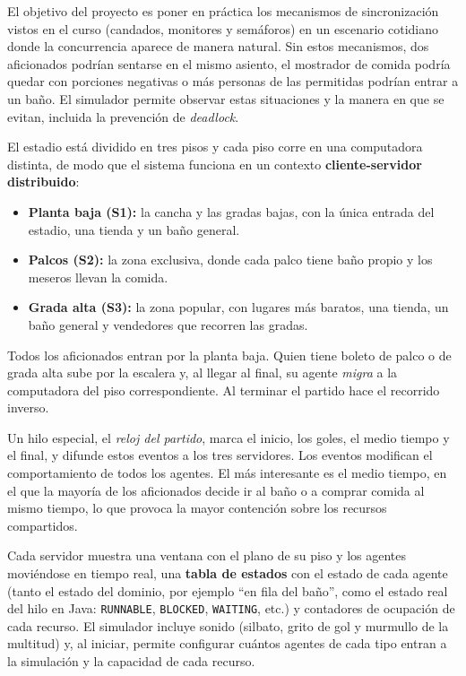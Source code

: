 \documentclass[11pt,letterpaper]{article}
\newcommand{\code}[1]{\texttt{#1}}
\begin{document}
El objetivo del proyecto es poner en práctica los mecanismos de sincronización vistos en el curso (candados, monitores y semáforos) en un escenario cotidiano donde la concurrencia aparece de manera natural. Sin estos mecanismos, dos aficionados podrían sentarse en el mismo asiento, el mostrador de comida podría quedar con porciones negativas o más personas de las permitidas podrían entrar a un baño. El simulador permite observar estas situaciones y la manera en que se evitan, incluida la prevención de \emph{deadlock}.

El estadio está dividido en tres pisos y cada piso corre en una computadora distinta, de modo que el sistema funciona en un contexto \textbf{cliente-servidor distribuido}:
\begin{itemize}
  \item \textbf{Planta baja (S1):} la cancha y las gradas bajas, con la única entrada del estadio, una tienda y un baño general.
  \item \textbf{Palcos (S2):} la zona exclusiva, donde cada palco tiene baño propio y los meseros llevan la comida.
  \item \textbf{Grada alta (S3):} la zona popular, con lugares más baratos, una tienda, un baño general y vendedores que recorren las gradas.
\end{itemize}
Todos los aficionados entran por la planta baja. Quien tiene boleto de palco o de grada alta sube por la escalera y, al llegar al final, su agente \emph{migra} a la computadora del piso correspondiente. Al terminar el partido hace el recorrido inverso.

Un hilo especial, el \emph{reloj del partido}, marca el inicio, los goles, el medio tiempo y el final, y difunde estos eventos a los tres servidores. Los eventos modifican el comportamiento de todos los agentes. El más interesante es el medio tiempo, en el que la mayoría de los aficionados decide ir al baño o a comprar comida al mismo tiempo, lo que provoca la mayor contención sobre los recursos compartidos.

Cada servidor muestra una ventana con el plano de su piso y los agentes moviéndose en tiempo real, una \textbf{tabla de estados} con el estado de cada agente (tanto el estado del dominio, por ejemplo ``en fila del baño'', como el estado real del hilo en Java: \code{RUNNABLE}, \code{BLOCKED}, \code{WAITING}, etc.) y contadores de ocupación de cada recurso. El simulador incluye sonido (silbato, grito de gol y murmullo de la multitud) y, al iniciar, permite configurar cuántos agentes de cada tipo entran a la simulación y la capacidad de cada recurso.
\end{document}
